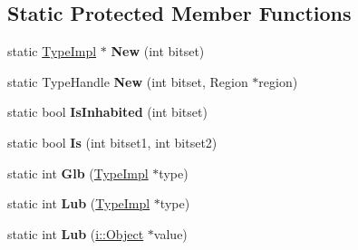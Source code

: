 \subsection*{Static Protected Member Functions}
\begin{DoxyCompactItemize}
\item 
\hypertarget{classv8_1_1internal_1_1_type_impl_1_1_bitset_type_a64c890ba302843c00f89b6a2ae66a6e2}{}static \hyperlink{classv8_1_1internal_1_1_type_impl}{Type\+Impl} $\ast$ {\bfseries New} (int bitset)\label{classv8_1_1internal_1_1_type_impl_1_1_bitset_type_a64c890ba302843c00f89b6a2ae66a6e2}

\item 
\hypertarget{classv8_1_1internal_1_1_type_impl_1_1_bitset_type_aeed5ad67c2f7de6d4056c15ffe27da05}{}static Type\+Handle {\bfseries New} (int bitset, Region $\ast$region)\label{classv8_1_1internal_1_1_type_impl_1_1_bitset_type_aeed5ad67c2f7de6d4056c15ffe27da05}

\item 
\hypertarget{classv8_1_1internal_1_1_type_impl_1_1_bitset_type_a2bd1ac3f1ebf7b698d857ecd44e2186d}{}static bool {\bfseries Is\+Inhabited} (int bitset)\label{classv8_1_1internal_1_1_type_impl_1_1_bitset_type_a2bd1ac3f1ebf7b698d857ecd44e2186d}

\item 
\hypertarget{classv8_1_1internal_1_1_type_impl_1_1_bitset_type_abfe887676ab4f44a60ce788eaf3d482f}{}static bool {\bfseries Is} (int bitset1, int bitset2)\label{classv8_1_1internal_1_1_type_impl_1_1_bitset_type_abfe887676ab4f44a60ce788eaf3d482f}

\item 
\hypertarget{classv8_1_1internal_1_1_type_impl_1_1_bitset_type_a9d0f978d5d316b328204f9e44eb9d4b1}{}static int {\bfseries Glb} (\hyperlink{classv8_1_1internal_1_1_type_impl}{Type\+Impl} $\ast$type)\label{classv8_1_1internal_1_1_type_impl_1_1_bitset_type_a9d0f978d5d316b328204f9e44eb9d4b1}

\item 
\hypertarget{classv8_1_1internal_1_1_type_impl_1_1_bitset_type_a8ae6d70c9e77fe0543b6256252415280}{}static int {\bfseries Lub} (\hyperlink{classv8_1_1internal_1_1_type_impl}{Type\+Impl} $\ast$type)\label{classv8_1_1internal_1_1_type_impl_1_1_bitset_type_a8ae6d70c9e77fe0543b6256252415280}

\item 
\hypertarget{classv8_1_1internal_1_1_type_impl_1_1_bitset_type_a80ee0122529f57651523b62a0a13d0ef}{}static int {\bfseries Lub} (\hyperlink{classv8_1_1internal_1_1_object}{i\+::\+Object} $\ast$value)\label{classv8_1_1internal_1_1_type_impl_1_1_bitset_type_a80ee0122529f57651523b62a0a13d0ef}


\end{DoxyCompactItemize}
